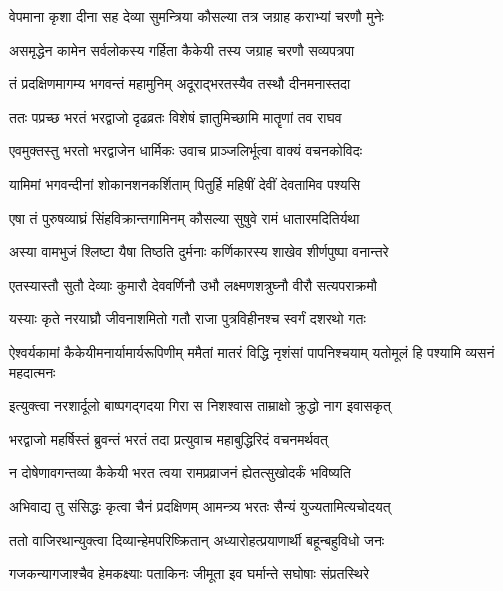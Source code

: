 \twolineshloka
{वेपमाना कृशा दीना सह देव्या सुमन्त्रिया}
{कौसल्या तत्र जग्राह कराभ्यां चरणौ मुनेः} %

\twolineshloka
{असमृद्धेन कामेन सर्वलोकस्य गर्हिता}
{कैकेयी तस्य जग्राह चरणौ सव्यपत्रपा} %

\twolineshloka
{तं प्रदक्षिणमागम्य भगवन्तं महामुनिम्}
{अदूराद्भरतस्यैव तस्थौ दीनमनास्तदा} %

\twolineshloka
{ततः पप्रच्छ भरतं भरद्वाजो दृढव्रतः}
{विशेषं ज्ञातुमिच्छामि मातॄणां तव राघव} %

\twolineshloka
{एवमुक्तस्तु भरतो भरद्वाजेन धार्मिकः}
{उवाच प्राञ्जलिर्भूत्वा वाक्यं वचनकोविदः} %

\twolineshloka
{यामिमां भगवन्दीनां शोकानशनकर्शिताम्}
{पितुर्हि महिषीं देवीं देवतामिव पश्यसि} %

\twolineshloka
{एषा तं पुरुषव्याघ्रं सिंहविक्रान्तगामिनम्}
{कौसल्या सुषुवे रामं धातारमदितिर्यथा} %

\twolineshloka
{अस्या वामभुजं श्लिष्टा यैषा तिष्ठति दुर्मनाः}
{कर्णिकारस्य शाखेव शीर्णपुष्पा वनान्तरे} %

\twolineshloka
{एतस्यास्तौ सुतौ देव्याः कुमारौ देववर्णिनौ}
{उभौ लक्ष्मणशत्रुघ्नौ वीरौ सत्यपराक्रमौ} %

\twolineshloka
{यस्याः कृते नरयाघ्रौ जीवनाशमितो गतौ}
{राजा पुत्रविहीनश्च स्वर्गं दशरथो गतः} %

\threelineshloka
{ऐश्वर्यकामां कैकेयीमनार्यामार्यरूपिणीम्}
{ममैतां मातरं विद्धि नृशंसां पापनिश्चयाम्}
{यतोमूलं हि पश्यामि व्यसनं महदात्मनः} %

\twolineshloka
{इत्युक्त्वा नरशार्दूलो बाष्पगद्गदया गिरा}
{स निशश्वास ताम्राक्षो क्रुद्धो नाग इवासकृत्} %

\twolineshloka
{भरद्वाजो महर्षिस्तं ब्रुवन्तं भरतं तदा}
{प्रत्युवाच महाबुद्धिरिदं वचनमर्थवत्} %

\twolineshloka
{न दोषेणावगन्तव्या कैकेयी भरत त्वया}
{रामप्रव्राजनं ह्येतत्सुखोदर्कं भविष्यति} %

\twolineshloka
{अभिवाद्य तु संसिद्धः कृत्वा चैनं प्रदक्षिणम्}
{आमन्त्र्य भरतः सैन्यं युज्यतामित्यचोदयत्} %

\twolineshloka
{ततो वाजिरथान्युक्त्वा दिव्यान्हेमपरिष्क्रितान्}
{अध्यारोहत्प्रयाणार्थी बहून्बहुविधो जनः} %

\twolineshloka
{गजकन्यागजाश्चैव हेमकक्ष्याः पताकिनः}
{जीमूता इव घर्मान्ते सघोषाः संप्रतस्थिरे} %

